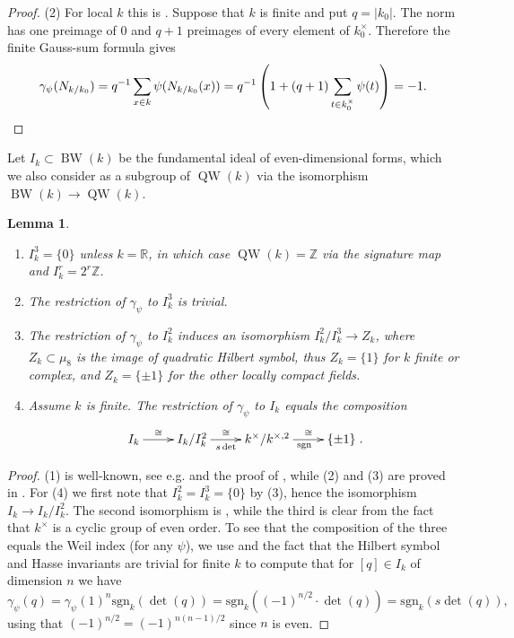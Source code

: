 \documentclass{article}
\def\R{\mathbb{R}}
\def\Z{\mathbb{Z}}
\newtheorem{lem}[thm]{Lemma}
\theoremstyle{definition}
\numberwithin{equation}{subsection}
\renewcommand{\-}{\hyp{}}
\DeclareMathOperator{\BW}{BW}
\DeclareMathOperator{\QW}{QW}
\begin{document}
\begin{appendices}
\begin{proof}
	(2) For local $k$ this is \cite[Lemma 1.2]{JL79}. Suppose that $k$ is finite and put $q=|k_0|$. The norm has one preimage of $0$ and $q+1$ preimages of every element of $k_0^\times$. Therefore the finite Gauss-sum formula gives
	\[ \gamma_\psi(N_{k/k_0})=q^{-1}\sum_{x\in k}\psi(N_{k/k_0}(x))=q^{-1}\left(1+(q+1)\sum_{t\in k_0^\times}\psi(t)\right)=-1.\qedhere\]
\end{proof}

Let $I_k \subset \BW(k)$ be the fundamental ideal of even-dimensional forms, which we also consider as a subgroup of $\QW(k)$ via the isomorphism $\BW(k) \to \QW(k)$. 

\begin{lem} \label{lem:weilindexsubqout}
\begin{enumerate}
	\item $I_k^3=\{0\}$ unless $k=\R$, in which case $\QW(k)=\Z$ via the signature map and $I_k^r=2^r\Z$.
	\item The restriction of $\gamma_\psi$ to $I_k^3$ is trivial.
	\item The restriction of $\gamma_\psi$ to $I_k^2$ induces an isomorphism $I_k^2/I_k^3 \to Z_k$, where $Z_k \subset \mu_8$ is the image of quadratic Hilbert symbol, thus $Z_k=\{1\}$ for $k$ finite or complex, and $Z_k=\{\pm1\}$ for the other locally compact fields.
	\item Assume $k$ is finite. The restriction of $\gamma_\psi$ to $I_k$ equals the composition
		\[ \xymatrix{ I_k\ar[r]^-\cong &I_k/I_k^2 \ar[r]^-\cong_-{s\det}& k^\times/k^{\times,2}\ar[r]^-\cong_{\mathrm{sgn}}& \{\pm1\}}.\] 
\end{enumerate}	
\end{lem}
\begin{proof}
	(1) is well-known, see e.g. \cite[Chapters 2,6]{Lam2005} and the proof of \cite[Theorem A.2]{Thomas2013}, while 
(2) and (3) are proved in \cite[A.4.1(d)]{Thomas2013}. For (4) we first note that $I_k^2=I_k^3=\{0\}$ by (3), hence the isomorphism $I_k \to I_k/I_k^2$. The second isomorphism is \cite[Chapter II, Proposition 2.1]{Lam2005}, while the third is clear from the fact that $k^\times$ is a cyclic group of even order. To see that the composition of the three equals the Weil index (for any $\psi$), we use \cite[A.4.1(b,c)]{Thomas2013} and the fact that the Hilbert symbol and Hasse invariants are trivial for finite $k$ to compute that for $[q] \in I_k$ of dimension $n$ we have 
\[ \gamma_\psi(q)=\gamma_\psi(1)^n\mathrm{sgn}_k(\det(q)) = \mathrm{sgn}_k((-1)^{n/2}\cdot\det(q))=\mathrm{sgn}_k(s\det(q)), \] 
using that $(-1)^{n/2}=(-1)^{n(n-1)/2}$ since $n$ is even.
\end{proof}


\end{appendices}
\end{document}
